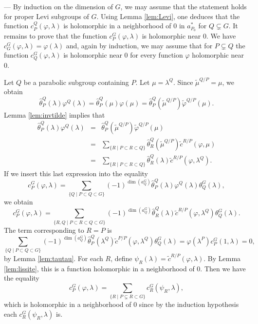 \begin{paragr} --- \label{S:demolissite} By induction on the dimension of $G$, we may assume that the statement holds for proper Levi subgroups of $G$. Using Lemma \ref{lem:Levi}, one deduces that the function $c_P^Q(\varphi,\lambda)$ is holomorphic in a neighborhood of $0$ in $a_{P_0}^*$ for $Q\subsetneq G$. It remains to prove that the function $c_P^G(\varphi,\lambda)$ is holomorphic near $0$. We have $c_G^G(\varphi,\lambda)=\varphi(\lambda)$ and, again by induction, we may assume that for $P\subsetneq Q$ the function $c_Q^G(\varphi,\lambda)$ is holomorphic near $0$ for every function $\varphi$ holomorphic near $0$.

Let $Q$ be a parabolic subgroup containing $P$. Let $\mu=\lambda^Q$. Since $\tilde{\mu}^{Q/P}=\mu$, we obtain
$$\hat{\theta}_P^Q(\lambda) \varphi^Q(\lambda)= \hat{\theta}_P^Q(\mu) \varphi(\mu)=\hat{\theta}_P^Q(\tilde{\mu}^{Q/P}) \tilde{\varphi}^{Q/P}(\mu).$$
Lemma \ref{lem:invtilde} implies that
\begin{eqnarray*}
 \hat{\theta}_P^Q(\lambda) \varphi^Q(\lambda)&=& \hat{\theta}_P^Q(\tilde{\mu}^{Q/P})\tilde{\varphi}^{Q/P}(\mu)\\
&=&\sum_{\{R\mid P\subset R\subset Q\}} \hat{\theta}_R^Q(\tilde{\mu}^{Q/P})
  \tilde{c}^{R/P}(\varphi,\mu)\\
&=&\sum_{\{R\mid P\subset R\subset Q\}} \hat{\theta}_R^Q(\lambda)  \tilde{c}^{R/P}(\varphi,\lambda^Q).
\end{eqnarray*}
If we insert this last expression into the equality
$$ c_P^G(\varphi,\lambda)=\sum_{\{Q \mid P\subset Q\subset G \}} (-1)^{\dim(a_Q^G)} \hat{\theta}_P^Q(\lambda) \varphi^Q(\lambda) \theta_Q^G(\lambda),$$
we obtain
\begin{equation}
  \label{eq:devissagec}
   c_P^G(\varphi,\lambda)=\sum_{\{R,Q \mid P\subset R\subset Q\subset G \}} (-1)^{\dim(a_Q^G)}  \hat{\theta}_R^Q(\lambda)  \tilde{c}^{R/P}(\varphi,\lambda^Q)   \theta_Q^G(\lambda).
 \end{equation}
 The term corresponding to $R=P$ is
$$\sum_{\{Q \mid P\subset Q\subset G \}} (-1)^{\dim(a_Q^G)}  \hat{\theta}_P^Q(\lambda^Q)  \tilde{c}^{P/P}(\varphi,\lambda^Q)   \theta_Q^G(\lambda)=\varphi(\lambda^P) c_P^G(1,\lambda)=0,$$
by Lemma \ref{lem:tautau}.
For each $R$, define $\psi_R(\lambda)= \tilde{c}^{R/P}(\varphi,\lambda)$. By Lemma \ref{lem:lissite}, this is a function holomorphic in a neighborhood of $0$. Then we have the equality
$$ c_P^G(\varphi,\lambda)=\sum_{\{R \mid P\subsetneq R\subset  G \}} c_R^G(\psi_R,\lambda),$$
which is holomorphic in a neighborhood of $0$ since by the induction hypothesis each $c_R^G(\psi_R,\lambda)$ is.
\end{paragr}

